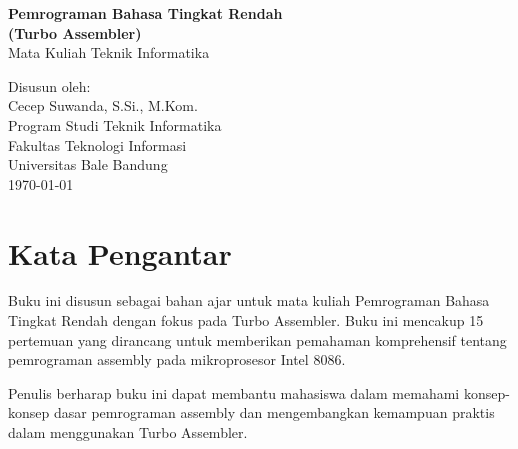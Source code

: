 \documentclass[a4paper,12pt]{book}
\begin{document}
\begin{titlepage}
\begin{center}
\vspace*{2cm}
{\Huge\bfseries Pemrograman Bahasa Tingkat Rendah}\\[0.5cm]
{\Large\bfseries (Turbo Assembler)}\\[1cm]
{\large Mata Kuliah Teknik Informatika}\\[2cm]

\vfill

{\large Disusun oleh:}\\
{\large Cecep Suwanda, S.Si., M.Kom.}\\[1cm]

{\large Program Studi Teknik Informatika}\\
{\large Fakultas Teknologi Informasi}\\
{\large Universitas Bale Bandung}\\[1cm]

{\large \today}
\end{center}
\end{titlepage}


\chapter*{Kata Pengantar}

Buku ini disusun sebagai bahan ajar untuk mata kuliah Pemrograman Bahasa Tingkat Rendah dengan fokus pada Turbo Assembler. Buku ini mencakup 15 pertemuan yang dirancang untuk memberikan pemahaman komprehensif tentang pemrograman assembly pada mikroprosesor Intel 8086.

\vspace{1cm}

Penulis berharap buku ini dapat membantu mahasiswa dalam memahami konsep-konsep dasar pemrograman assembly dan mengembangkan kemampuan praktis dalam menggunakan Turbo Assembler.

\newpage

\tableofcontents
\newpage
















\end{document}
